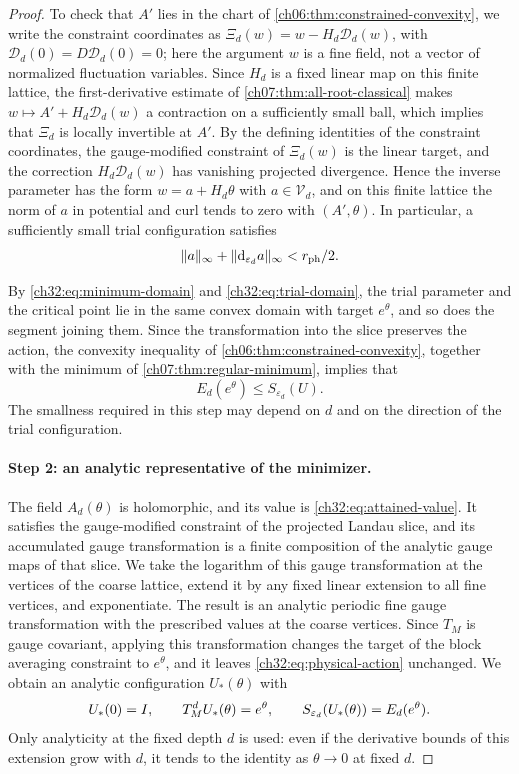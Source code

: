 \begin{proof}
To check that $A'$ lies in the chart of \cref{ch06:thm:constrained-convexity}, we write the constraint coordinates as $\Xi_d(w)=w-H_d\mathscr D_d(w)$, with $\mathscr D_d(0)=D\mathscr D_d(0)=0$; here the argument $w$ is a fine field, not a vector of normalized fluctuation variables. Since $H_d$ is a fixed linear map on this finite lattice, the first-derivative estimate of \cref{ch07:thm:all-root-classical} makes $w\mapsto A'+H_d\mathscr D_d(w)$ a contraction on a sufficiently small ball, which implies that $\Xi_d$ is locally invertible at $A'$. By the defining identities of the constraint coordinates, the gauge-modified constraint of $\Xi_d(w)$ is the linear target, and the correction $H_d\mathscr D_d(w)$ has vanishing projected divergence. Hence the inverse parameter has the form $w=a+H_d\theta$ with $a\in\mathcal V_d$, and on this finite lattice the norm of $a$ in potential and curl tends to zero with $(A',\theta)$. In particular, a sufficiently small trial configuration satisfies
\begin{equation}\label{ch32:eq:trial-domain}
 \lVert a\rVert_\infty+\lVert \mathrm d_{\varepsilon_d}a\rVert_\infty<r_{\mathrm{ph}}/2.
\end{equation}

By \eqref{ch32:eq:minimum-domain} and \eqref{ch32:eq:trial-domain}, the trial parameter and the critical point lie in the same convex domain with target $e^\theta$, and so does the segment joining them. Since the transformation into the slice preserves the action, the convexity inequality of \cref{ch06:thm:constrained-convexity}, together with the minimum of \cref{ch07:thm:regular-minimum}, implies that
\begin{equation}\label{ch32:eq:trial-comparison}
 E_d(e^\theta)\le S_{\varepsilon_d}(U).
\end{equation}
The smallness required in this step may depend on $d$ and on the direction of the trial configuration.

\paragraph{Step 2: an analytic representative of the minimizer.}
The field $A_d(\theta)$ is holomorphic, and its value is \eqref{ch32:eq:attained-value}. It satisfies the gauge-modified constraint of the projected Landau slice, and its accumulated gauge transformation is a finite composition of the analytic gauge maps of that slice. We take the logarithm of this gauge transformation at the vertices of the coarse lattice, extend it by any fixed linear extension to all fine vertices, and exponentiate. The result is an analytic periodic fine gauge transformation with the prescribed values at the coarse vertices. Since $T_M$ is gauge covariant, applying this transformation changes the target of the block averaging constraint to $e^\theta$, and it leaves \eqref{ch32:eq:physical-action} unchanged. We obtain an analytic configuration $U_*(\theta)$ with
\[
 U_*(0)=I,\qquad T_M^dU_*(\theta)=e^\theta,\qquad S_{\varepsilon_d}(U_*(\theta))=E_d(e^\theta).
\]
Only analyticity at the fixed depth $d$ is used: even if the derivative bounds of this extension grow with $d$, it tends to the identity as $\theta\to0$ at fixed $d$.


\end{proof}
